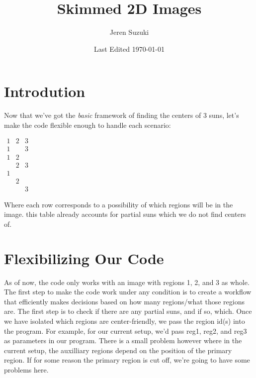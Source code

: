 \documentclass[10pt]{scrartcl}
\title{Skimmed 2D Images}
\author{Jeren Suzuki}
\date{Last Edited \today}
\begin{document}
\maketitle
{}
\tableofcontents
\clearpage
{}

\section{Introdution} %
\label{sec:introdution}
    Now that we've got the \emph{basic} framework of finding the centers of 3 suns, let's make the code flexible enough to handle each scenario:\\
\begin{center}
    $\begin{matrix} 
    1 & 2 & 3 \\ 
    1 &  & 3\\
    1 & 2 & \\
     & 2 & 3\\
    1 &  & \\
     & 2 & \\
     &  & 3
    \end{matrix}$
\end{center}

Where each row corresponds to a possibility of which regions will be in the image. this table already accounts for partial suns which we do not find centers of. 

\section{Flexibilizing Our Code} %
\label{sec:flexibilizing_our_code}

As of now, the code only works with an image with regions 1, 2, and 3 as whole. The first step to make the code work under any condition is to create a workflow that efficiently makes decisions based on how many regions/what those regions are. The first step is to check if there are any partial suns, and if so, which. Once we have isolated which regions are center-friendly, we pass the region id(s) into the program. For example, for our current setup, we'd pass reg1, reg2, and reg3 as parameters in our program. There is a small problem however where in the current setup, the auxilliary regions depend on the position of the primary region. If for some reason the primary region is cut off, we're going to have some problems here.
\end{document}
